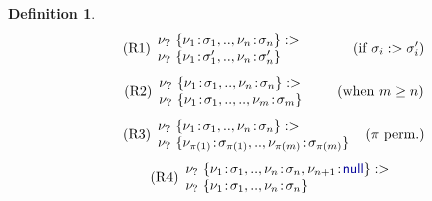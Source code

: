 \documentclass[10pt,preprint,clearpagebib]{sigplanconf}
\newcommand{\kvd}[1]{\textnormal{\textcolor{kvdclr}{\sffamily #1}}}
\newtheorem{definition}{Definition}
\begin{document}
\begin{definition}
\noindent{}
\begin{align}
\label{eq:sub-record1}\tag{R1}
\begin{array}{l}
 \nu_?~\{ \nu_1\!:\!\sigma_1, .., \nu_n\!:\!\sigma_n \} :> \\
 \nu_?~\{ \nu_1\!:\!\sigma_1', .., \nu_n\!:\!\sigma_n' \}
\end{array} \qquad ~~~~(\textnormal{if}~\sigma_i :> \sigma_i')
\end{align}
\vspace{-0.8em}
\begin{align}
\label{eq:sub-record2}\tag{R2}
\begin{array}{l}
 \nu_?~\{ \nu_1\!:\!\sigma_1, .., \nu_n\!:\!\sigma_n \} :> \\
 \nu_?~\{ \nu_1\!:\!\sigma_1, .., .., \nu_m\!:\!\sigma_m \}
\end{array} \qquad (\textnormal{when}~m \geq n)
\end{align}
\vspace{-0.8em}
\begin{align}
\label{eq:sub-record3}\tag{R3}
\begin{array}{l}
 \nu_?~\{ \nu_1\!:\!\sigma_1, .., \nu_n\!:\!\sigma_n \} :> \\
 \nu_?~\{ \nu_{\pi(1)}\!:\!\sigma_{\pi(1)}, .., \nu_{\pi(m)}\!:\!\sigma_{\pi(m)} \}
\end{array} ~~(\pi~\textnormal{perm.})
\end{align}
\vspace{-0.8em}
\begin{align}
\label{eq:sub-record4}\tag{R4}
\begin{array}{l}
 \nu_?~\{ \nu_1\!:\!\sigma_1, .., \nu_n\!:\!\sigma_n, \nu_{n+1}\!:\!\kvd{null} \} :> \\
 \nu_?~\{ \nu_1\!:\!\sigma_1, .., \nu_n\!:\!\sigma_n \}
\end{array}
\end{align}
\end{definition}

\end{document}
